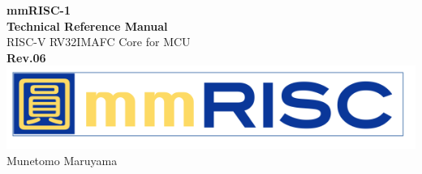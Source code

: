 \begin{titlepage}
    \begin{center}
        \vspace*{5cm}
        {\Huge \textbf{mmRISC-1}}\\[1cm]
        {\Huge \textbf{Technical Reference Manual}}\\[2cm]
        {\LARGE{RISC-V RV32IMAFC Core for MCU}}\\[3cm]
        {\LARGE \textbf{Rev.06}}\\[3cm]
        \includegraphics[width=0.75\columnwidth]{./Logo/mmRISC_Logo.png}\\[2cm]
        {\LARGE{Munetomo Maruyama}}\\[0.5cm]
    \end{center} 
\end{titlepage}

